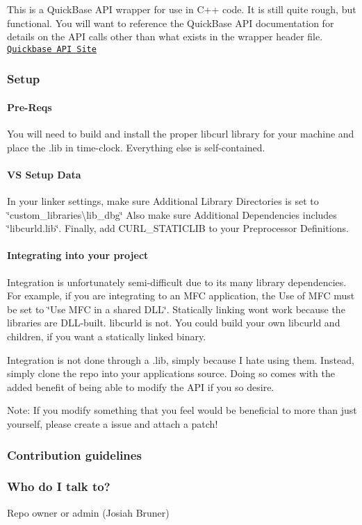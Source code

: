 This is a Quick\+Base A\+P\+I wrapper for use in C++ code. It is still quite rough, but functional. You will want to reference the Quick\+Base A\+P\+I documentation for details on the A\+P\+I calls other than what exists in the wrapper header file. \href{http://www.quickbase.com/api-guide/index.html}{\tt Quickbase A\+P\+I Site}

\subsubsection*{Setup}

\paragraph*{Pre-\/\+Reqs}

You will need to build and install the proper libcurl library for your machine and place the .lib in time-\/clock. Everything else is self-\/contained.

\paragraph*{V\+S Setup Data}

In your linker settings, make sure Additional Library Directories is set to \char`\"{}custom\+\_\+libraries\textbackslash{}lib\+\_\+dbg\char`\"{} Also make sure Additional Dependencies includes \char`\"{}libcurld.\+lib\char`\"{}. Finally, add C\+U\+R\+L\+\_\+\+S\+T\+A\+T\+I\+C\+L\+I\+B to your Preprocessor Definitions.

\paragraph*{Integrating into your project}

Integration is unfortunately semi-\/difficult due to its many library dependencies. For example, if you are integrating to an M\+F\+C application, the Use of M\+F\+C must be set to \char`\"{}\+Use M\+F\+C in a shared D\+L\+L\char`\"{}. Statically linking won\textquotesingle{}t work because the libraries are D\+L\+L-\/built. libcurld is not. You could build your own libcurld and children, if you want a statically linked binary.

Integration is not done through a .lib, simply because I hate using them. Instead, simply clone the repo into your application\textquotesingle{}s source. Doing so comes with the added benefit of being able to modify the A\+P\+I if you so desire.

Note\+: If you modify something that you feel would be beneficial to more than just yourself, please create a issue and attach a patch!

\subsubsection*{Contribution guidelines}

\subsubsection*{Who do I talk to?}


\begin{DoxyItemize}
\item Repo owner or admin (Josiah Bruner) 
\end{DoxyItemize}